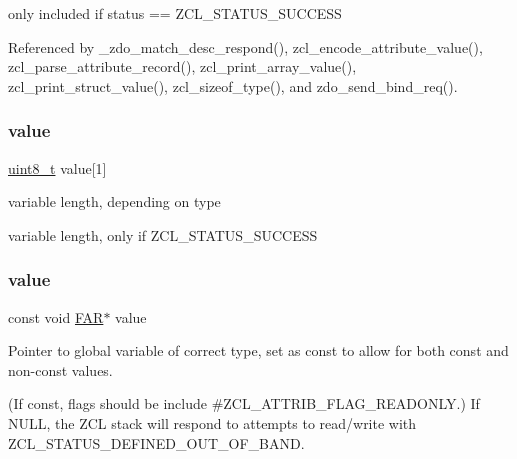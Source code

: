 only included if status == Z\+C\+L\+\_\+\+S\+T\+A\+T\+U\+S\+\_\+\+S\+U\+C\+C\+E\+SS 

Referenced by \+\_\+zdo\+\_\+match\+\_\+desc\+\_\+respond(), zcl\+\_\+encode\+\_\+attribute\+\_\+value(), zcl\+\_\+parse\+\_\+attribute\+\_\+record(), zcl\+\_\+print\+\_\+array\+\_\+value(), zcl\+\_\+print\+\_\+struct\+\_\+value(), zcl\+\_\+sizeof\+\_\+type(), and zdo\+\_\+send\+\_\+bind\+\_\+req().

\mbox{\label{group__zcl_ga1ed5b151a90f7e99af8cca2e6875ddf4}} 
\subsubsection{\texorpdfstring{value}{value}\hspace{0.1cm}{\footnotesize\ttfamily [1/2]}}
{\footnotesize\ttfamily \hyperlink{group__hal__dos_gae1affc9ca37cfb624959c866a73f83c2}{uint8\+\_\+t} value\mbox{[}1\mbox{]}}



variable length, depending on type 

variable length, only if Z\+C\+L\+\_\+\+S\+T\+A\+T\+U\+S\+\_\+\+S\+U\+C\+C\+E\+SS \mbox{\label{group__zcl_gaaaa0b89997c57cfca2dfae40f46e702d}} 
\subsubsection{\texorpdfstring{value}{value}\hspace{0.1cm}{\footnotesize\ttfamily [2/2]}}
{\footnotesize\ttfamily const void \hyperlink{group__hal_gaef060b3456fdcc093a7210a762d5f2ed}{F\+AR}$\ast$ value}



Pointer to global variable of correct type, set as {\ttfamily const} to allow for both const and non-\/const values. 

(If {\ttfamily const}, flags should be include \#\+Z\+C\+L\+\_\+\+A\+T\+T\+R\+I\+B\+\_\+\+F\+L\+A\+G\+\_\+\+R\+E\+A\+D\+O\+N\+LY.) If N\+U\+LL, the Z\+CL stack will respond to attempts to read/write with Z\+C\+L\+\_\+\+S\+T\+A\+T\+U\+S\+\_\+\+D\+E\+F\+I\+N\+E\+D\+\_\+\+O\+U\+T\+\_\+\+O\+F\+\_\+\+B\+A\+ND. \mbox{\label{group__zcl_gac8bd2f85f7df500d34b1d3cd27033a4e}} 
